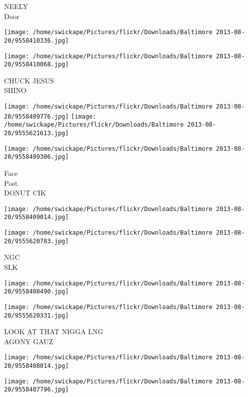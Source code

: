 \documentclass[10pt,letterpaper]{article}
\begin{document}
NEELY\\
Door\\
\pagebreak

\texttt{[image: /home/swickape/Pictures/flickr/Downloads/Baltimore 2013-08-20/9558410336.jpg]}

\vspace{0.25in}
\texttt{[image: /home/swickape/Pictures/flickr/Downloads/Baltimore 2013-08-20/9558410068.jpg]}

CHUCK JESUS\\
SHINO\\
\pagebreak

\texttt{[image: /home/swickape/Pictures/flickr/Downloads/Baltimore 2013-08-20/9558409776.jpg]}
\texttt{[image: /home/swickape/Pictures/flickr/Downloads/Baltimore 2013-08-20/9555621613.jpg]}

\vspace{0.25in}
\texttt{[image: /home/swickape/Pictures/flickr/Downloads/Baltimore 2013-08-20/9558409306.jpg]}

Face\\
Post\\
DONUT CIK\\
\pagebreak

\texttt{[image: /home/swickape/Pictures/flickr/Downloads/Baltimore 2013-08-20/9558409014.jpg]}

\vspace{0.25in}
\texttt{[image: /home/swickape/Pictures/flickr/Downloads/Baltimore 2013-08-20/9555620783.jpg]}

NGC\\
SLK\\
\pagebreak

\texttt{[image: /home/swickape/Pictures/flickr/Downloads/Baltimore 2013-08-20/9558408490.jpg]}

\vspace{0.25in}
\texttt{[image: /home/swickape/Pictures/flickr/Downloads/Baltimore 2013-08-20/9555620331.jpg]}

LOOK AT THAT NIGGA LNG\\
AGONY GAUZ\\
\pagebreak

\texttt{[image: /home/swickape/Pictures/flickr/Downloads/Baltimore 2013-08-20/9558408014.jpg]}

\vspace{0.25in}
\texttt{[image: /home/swickape/Pictures/flickr/Downloads/Baltimore 2013-08-20/9558407796.jpg]}
\end{document}
